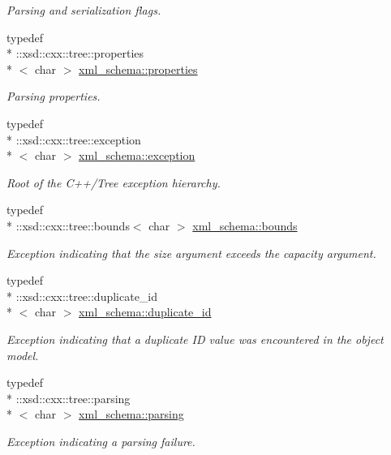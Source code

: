 \begin{DoxyCompactItemize}
\begin{DoxyCompactList}\small\item\em Parsing and serialization flags. \end{DoxyCompactList}\item 
typedef \\*
\+::xsd\+::cxx\+::tree\+::properties\\*
$<$ char $>$ \hyperlink{namespacexml__schema_aba199bc39c8b21c427369c27d2bcfc8c}{xml\+\_\+schema\+::properties}
\begin{DoxyCompactList}\small\item\em Parsing properties. \end{DoxyCompactList}\item 
typedef \\*
\+::xsd\+::cxx\+::tree\+::exception\\*
$<$ char $>$ \hyperlink{namespacexml__schema_a7eb0fa6af3de36ea17011d26a731b62b}{xml\+\_\+schema\+::exception}
\begin{DoxyCompactList}\small\item\em Root of the C++/\+Tree exception hierarchy. \end{DoxyCompactList}\item 
typedef \\*
\+::xsd\+::cxx\+::tree\+::bounds$<$ char $>$ \hyperlink{namespacexml__schema_a00337f2f08dbcb24280f5cf7b96224ea}{xml\+\_\+schema\+::bounds}
\begin{DoxyCompactList}\small\item\em Exception indicating that the size argument exceeds the capacity argument. \end{DoxyCompactList}\item 
typedef \\*
\+::xsd\+::cxx\+::tree\+::duplicate\+\_\+id\\*
$<$ char $>$ \hyperlink{namespacexml__schema_a22a2b3c973b87b06c2868d85a154fd63}{xml\+\_\+schema\+::duplicate\+\_\+id}
\begin{DoxyCompactList}\small\item\em Exception indicating that a duplicate I\+D value was encountered in the object model. \end{DoxyCompactList}\item 
typedef \\*
\+::xsd\+::cxx\+::tree\+::parsing\\*
$<$ char $>$ \hyperlink{namespacexml__schema_a150f88d7d2156ae81807b142038684f5}{xml\+\_\+schema\+::parsing}
\begin{DoxyCompactList}\small\item\em Exception indicating a parsing failure. \end{DoxyCompactList}\item 

\end{DoxyCompactItemize}

